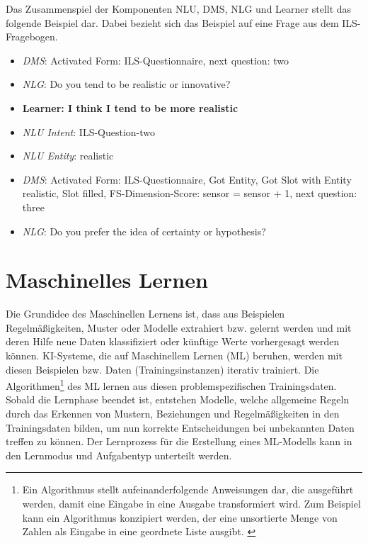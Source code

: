         Das Zusammenspiel der Komponenten NLU, DMS, NLG und Learner stellt das folgende Beispiel dar. Dabei bezieht sich das Beispiel auf eine Frage aus dem ILS-Fragebogen.
        \begin{itemize}
            \item[] \textit{DMS}: Activated Form: ILS-Questionnaire, next question: two
            \item[] \textit{NLG}: Do you tend to be realistic or innovative?
            \item[] \textbf{Learner: I think I tend to be more realistic}
            \item[] \textit{NLU Intent}: ILS-Question-two
            \item[] \textit{NLU Entity}: realistic
            \item[] \textit{DMS}: Activated Form: ILS-Questionnaire, Got Entity, Got Slot with Entity realistic, Slot filled, FS-Dimension-Score: sensor = sensor + 1, next question: three
            \item[] \textit{NLG}: Do you prefer the idea of certainty or hypothesis?
        \end{itemize}

\section{Maschinelles Lernen}\label{ML}
    Die Grundidee des Maschinellen Lernens ist, dass aus Beispielen Regelmä{\ss}igkeiten, Muster oder Modelle extrahiert bzw.
    gelernt werden und mit deren Hilfe neue Daten klassifiziert oder künftige Werte vorhergesagt werden können.
    KI-Systeme, die auf Maschinellem Lernen (ML) beruhen, werden mit diesen Beispielen bzw. Daten (Trainingsinstanzen)
    iterativ trainiert. Die Algorithmen\footnote{ Ein Algorithmus stellt aufeinanderfolgende Anweisungen dar, die ausgeführt werden, damit eine Eingabe in eine Ausgabe transformiert wird. Zum Beispiel kann ein Algorithmus konzipiert werden, der eine unsortierte Menge von Zahlen als Eingabe in eine geordnete Liste ausgibt. \parencite[2]{Alpaydin.2019}}
    des ML lernen aus diesen problemspezifischen Trainingsdaten.
    Sobald die Lernphase beendet ist, entstehen Modelle, welche allgemeine Regeln durch das Erkennen 
    von Mustern, Beziehungen und Regelmäßigkeiten in den Trainingsdaten bilden, um nun korrekte Entscheidungen bei
    unbekannten Daten treffen zu können.
    Der Lernprozess für die Erstellung eines ML-Modells kann in den Lernmodus und Aufgabentyp unterteilt werden. \parencite[35]{deru.2020}
        

